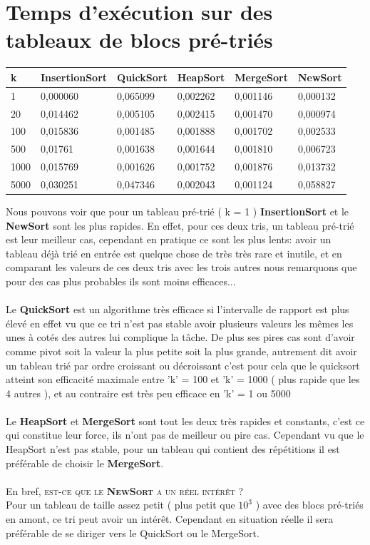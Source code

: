 \documentclass[a4paper, 11pt, oneside]{article}
\begin{document}
\section{Temps d'exécution sur des tableaux de blocs pré-triés}
\begin{table}[htb]
\begin{tabular}{llllll}
\hline
k    & InsertionSort & QuickSort & HeapSort & MergeSort & NewSort \\ \hline
1    & 0,000060              & 0,065099          & 0,002262         & 0,001146          & 0,000132        \\
20   & 0,014462              & 0,005105          & 0,002415         & 0,001470          & 0,000974        \\
100  & 0,015836              & 0,001485          & 0,001888      & 0,001702          & 0,002533        \\
500  & 0,01761              & 0,001638          & 0,001644         & 0,001810          & 0,006723        \\
1000 & 0,015769              & 0,001626          & 0,001752         & 0,001876          & 0,013732        \\
5000 & 0,030251              & 0,047346          & 0,002043         & 0,001124          & 0,058827       
\end{tabular}
\end{table}
Nous pouvons voir que pour un tableau pré-trié ( k = 1 ) \textbf{InsertionSort} et le \textbf{NewSort} sont les plus rapides. En effet, pour ces deux tris, un tableau pré-trié est leur meilleur cas, cependant en pratique ce sont les plus lents: avoir un tableau déjà trié en entrée est quelque chose de très très rare et inutile, et en comparant les valeurs de ces deux tris avec les trois autres nous remarquons que pour des cas plus probables ils sont moins efficaces... \\ \\
Le \textbf{QuickSort} est un algorithme très efficace si l'intervalle de rapport est plus élevé en effet vu que ce tri n'est pas stable avoir plusieurs valeurs les mêmes les unes à cotés des autres lui complique la tâche. De plus ses pires cas sont d'avoir comme pivot soit la valeur la plus petite soit la plus grande, autrement dit avoir un tableau trié par ordre croissant ou décroissant c'est pour cela que le quicksort atteint son efficacité maximale entre 'k' = 100 et 'k' = 1000 ( plus rapide que les 4 autres ), et au contraire est très peu efficace en 'k' = 1 ou 5000\\
\\
Le \textbf{HeapSort} et \textbf{MergeSort} sont tout les deux très rapides et constants, c'est ce qui constitue leur force, ils n'ont pas de meilleur ou pire cas. Cependant vu que le HeapSort n'est pas stable, pour un tableau qui contient des répétitions il est préférable de choisir le \textbf{MergeSort}.
\\ \\
En bref, \textsc{est-ce que le \textbf{NewSort} a un réel intérêt ?} \\ Pour un tableau de taille assez petit ( plus petit que $10^{3}$ ) avec des blocs pré-triés en amont, ce tri peut avoir un intérêt. Cependant en situation réelle il sera préférable de se diriger vers le QuickSort ou le MergeSort. 
 
\end{document}
